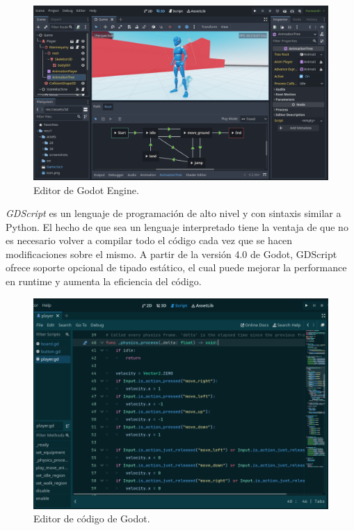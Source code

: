 \begin{figure}[htbp]
    \centering
    \includegraphics[width=1.0\textwidth]{../assets/godot-engine-showcase.png}
    \caption{Editor de Godot Engine.\cite{ref1}}
\end{figure}

\textit{GDScript} es un lenguaje de programación de alto nivel y con sintaxis similar a Python. 
El hecho de que sea un lenguaje interpretado tiene la ventaja de que no es necesario volver a compilar 
todo el código cada vez que se hacen modificaciones sobre el mismo.
A partir de la versión 4.0 de Godot, GDScript ofrece soporte opcional de tipado estático, el cual puede
mejorar la performance en runtime y aumenta la eficiencia del código.

\begin{figure}[htbp]
    \centering
    \includegraphics[width=1.0\textwidth]{../assets/godot-code-editor.png}
    \caption{Editor de código de Godot.}
\end{figure}

